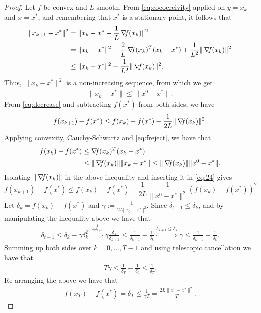 \documentclass[10pt,a4paper]{article}
\begin{document}
\begin{proof}
	Let $f$ be convex and $L$-smooth. From \eqref{eq:cocoercivity} applied on $y=x_k$ and $x=x^*$, and remembering that $x^*$ is a stationary point, it follows that
	\begin{align*}
		\|x_{k+1} - x^*\|^2 &= \|x_k - x^* - \frac{1}{L}\operatorname*{\mathit{\nabla \!f}}(x_k)\|^2\\
		&= \|x_k - x^*\|^2 - \frac{2}{L} \operatorname*{\mathit{\nabla \!f}}(x_k)^T(x_k - x^*) + \frac{1}{L^2}\|\operatorname*{\mathit{\nabla \!f}}(x_k)\|^2\\
		&\leq \|x_k - x^*\|^2 - \frac{1}{L^2}\|\operatorname*{\mathit{\nabla \!f}}(x_k)\|^2.
	\end{align*}
	Thus, $\|x_k - x^*\|^2$ is a non-increasing sequence, from which we get 
	\begin{align}\label{eq:freject}
		\|x_k - x^*\| \leq \|x^0 - x^*\|.
	\end{align}
	From \eqref{eq:decrease} and subtracting $f(x^*)$ from both sides, we have
	\begin{align}\label{eq:24}
		f(x_{k+1}) - f(x^*) \leq f(x_k) - f(x^*) - \frac{1}{2L}\|\operatorname*{\mathit{\nabla \!f}}(x_k)\|^2.
	\end{align}
	Applying convexity, Cauchy-Schwartz and \eqref{eq:freject}, we have that
	\begin{equation*}
		\begin{split}
			f(x_k) - f(x^*) &\leq \operatorname*{\mathit{\nabla \!f}}(x_k)^T(x_k - x^*)\\
			&\leq \|\operatorname*{\mathit{\nabla \!f}}(x_k)\|\|x_k - x^*\| \leq \|\operatorname*{\mathit{\nabla \!f}}(x_k)\|\|x^0 - x^*\|.
		\end{split}
	\end{equation*}
	Isolating $\|\operatorname*{\mathit{\nabla \!f}}(x_k)\|$ in the above inequality and inserting it in \eqref{eq:24} gives
	\begin{equation*}
		f(x_{k+1}) - f(x^*) \leq f(x_k) - f(x^*) - \frac{1}{2L}\frac{1}{\|x^0 - x^*\|^2}(f(x_k) - f(x^*))^2
	\end{equation*}
	Let $\delta_k = f(x_k) - f(x^*)$ and $\gamma:=\frac{1}{2L||x_0-x^*||^2}$. Since $\delta_{t+1} \leq \delta_k$, and by manipulating the inequality above we have that
	\begin{align*}
		\delta_{t+1} \leq \delta_k - \gamma\delta_k^2 \overset{\cdot\frac{1}{\delta_k\delta_{k+1}}}{\Rightarrow} \gamma\frac{\delta_k}{\delta_{k+1}} \leq \frac{1}{\delta_{k+1}} - \frac{1}{\delta_k} \overset{\delta_{k+1}\leq\delta_k}{\Leftrightarrow} \gamma \leq \frac{1}{\delta_{k+1}} - \frac{1}{\delta_k}.
	\end{align*}
	Summing up both sides over $k = 0, \ldots, T - 1$ and using telescopic cancellation we have that
	\begin{align*}
		T\gamma \leq \frac{1}{\delta_T} - \frac{1}{\delta_0} \leq \frac{1}{\delta_T}.
	\end{align*}
Re-arranging the above we have that
	\begin{align*}
		f(x_T) - f(x^*) = \delta_T \leq \frac{1}{\gamma T} = \frac{2L\|x^0 - x^*\|^2}{T}.
	\end{align*}
\end{proof}
\end{document}
